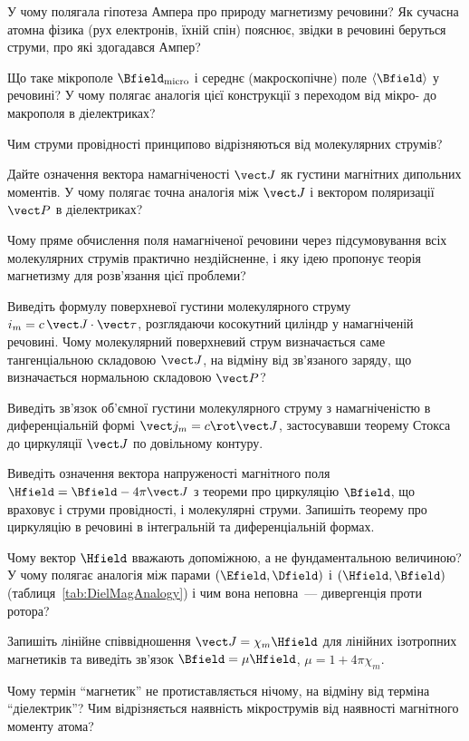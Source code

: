 \begin{Questions}
\begin{quizlist}
	\item У чому полягала гіпотеза Ампера про природу магнетизму речовини? Як сучасна атомна фізика (рух електронів, їхній спін) пояснює, звідки в речовині беруться струми, про які здогадався Ампер?
	\item Що таке мікрополе $\Bfield_\text{micro}$ і середнє (макроскопічне) поле $\langle\Bfield\rangle$ у речовині? У чому полягає аналогія цієї конструкції з переходом від мікро- до макрополя в діелектриках?
	\item Чим струми провідності принципово відрізняються від молекулярних струмів?
	\item Дайте означення вектора намагніченості $\vect J$ як густини магнітних дипольних моментів. У чому полягає точна аналогія між $\vect J$ і вектором поляризації $\vect P$ в діелектриках?
	\item Чому пряме обчислення поля намагніченої речовини через підсумовування всіх молекулярних струмів практично нездійсненне, і яку ідею пропонує теорія магнетизму для розв'язання цієї проблеми?
	\item Виведіть формулу поверхневої густини молекулярного струму $i_m = c\,\vect J\cdot\vect\tau$, розглядаючи косокутний циліндр у намагніченій речовині. Чому молекулярний поверхневий струм визначається саме тангенціальною складовою $\vect J$, на відміну від зв'язаного заряду, що визначається нормальною складовою $\vect P$?
	\item Виведіть зв'язок об'ємної густини молекулярного струму з намагніченістю в диференціальній формі $\vect j_m = c\rot\vect J$, застосувавши теорему Стокса до циркуляції $\vect J$ по довільному контуру.
	\item Виведіть означення вектора напруженості магнітного поля $\Hfield = \Bfield - 4\pi\vect J$ з теореми про циркуляцію $\Bfield$, що враховує і струми провідності, і молекулярні струми. Запишіть теорему про циркуляцію в речовині в інтегральній та диференціальній формах.
	\item Чому вектор $\Hfield$ вважають допоміжною, а не фундаментальною величиною? У чому полягає аналогія між парами $(\Efield,\Dfield)$ і $(\Hfield,\Bfield)$ (таблиця~\ref{tab:DielMagAnalogy}) і чим вона неповна~--- дивергенція проти ротора?
	\item Запишіть лінійне співвідношення $\vect J = \chi_m\Hfield$ для лінійних ізотропних магнетиків та виведіть зв'язок $\Bfield=\mu\Hfield$, $\mu=1+4\pi\chi_m$.
	\item Чому термін \enquote{магнетик} не протиставляється нічому, на відміну від терміна \enquote{діелектрик}? Чим відрізняється наявність мікрострумів від наявності магнітного моменту атома?

\end{quizlist}
\end{Questions}
